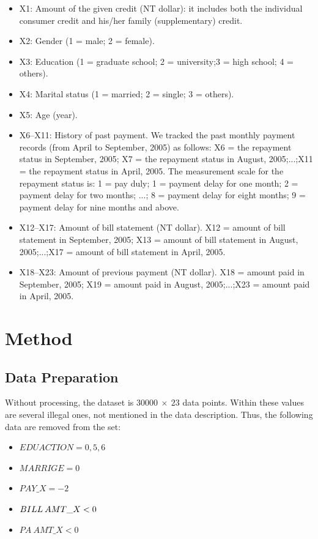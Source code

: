 \documentclass[a4paper,11pt,twocolumn]{article}
\begin{document}
\begin{itemize}
\item X1: Amount of the given credit (NT dollar): it includes both the individual consumer credit and his/her family (supplementary) credit.
\item X2: Gender (1 = male; 2 = female).
\item X3: Education (1 = graduate school; 2 = university;3 = high school; 4 = others).
\item X4: Marital status (1 = married; 2 = single; 3 = others).
\item X5: Age (year).
\item X6–X11: History of past payment. We tracked the past monthly payment records (from April to September,
2005) as follows: X6 = the repayment status in September, 2005; X7 = the repayment status in August,
2005;...;X11 = the repayment status in April, 2005.
The measurement scale for the repayment status is:
1 = pay duly; 1 = payment delay for one month;
2 = payment delay for two months; ...; 8 = payment
delay for eight months; 9 = payment delay for nine
months and above.
\item X12–X17: Amount of bill statement (NT dollar).
X12 = amount of bill statement in September, 2005;
X13 = amount of bill statement in August,
2005;...;X17 = amount of bill statement in April, 2005. 
\item X18–X23: Amount of previous payment (NT dollar).
X18 = amount paid in September, 2005; X19 = amount
paid in August, 2005;...;X23 = amount paid in April,
2005.
\end{itemize}


\section{Method}

\subsection{Data Preparation} 
Without processing, the dataset is $30000\: \times\: 23$ data points. Within these values are several illegal ones, not mentioned in the data description. Thus, the following data are removed from the set:
\begin{itemize}
\item[] $EDUACTION = 0,5,6$
\item[] $MARRIGE = 0$
\item[] $PAY\_X = -2$
\item[] $BILL\:AMT\text\_X < 0$
\item[] $PA\:AMT\_X < 0$
\end{itemize}
\end{document}
